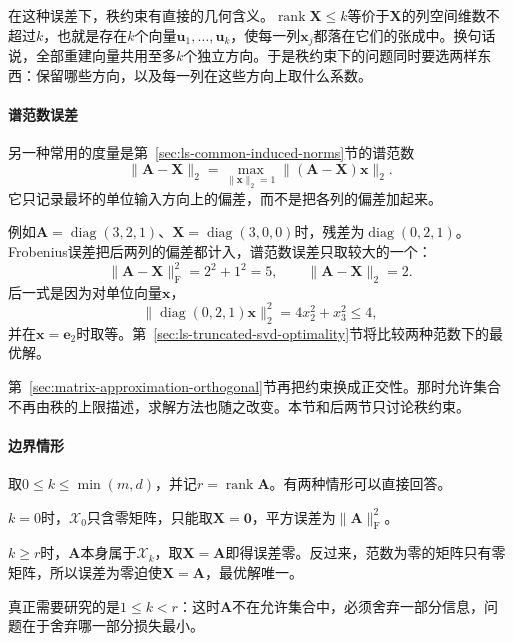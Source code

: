 在这种误差下，秩约束有直接的几何含义。$\operatorname{rank}\bm X\leq k$等价于$\bm X$的列空间维数不超过$k$，也就是存在$k$个向量$\bm u_1,\ldots,\bm u_k$，使每一列$\bm x_j$都落在它们的张成中。换句话说，全部重建向量共用至多$k$个独立方向。于是秩约束下的问题同时要选两样东西：保留哪些方向，以及每一列在这些方向上取什么系数。

\paragraph{谱范数误差}
另一种常用的度量是第~\ref{sec:ls-common-induced-norms}节的谱范数
\[
 \lVert\bm A-\bm X\rVert_2=\max_{\lVert\bm x\rVert_2=1}\lVert(\bm A-\bm X)\bm x\rVert_2 .
\]
它只记录最坏的单位输入方向上的偏差，而不是把各列的偏差加起来。

例如$\bm A=\operatorname{diag}(3,2,1)$、$\bm X=\operatorname{diag}(3,0,0)$时，残差为$\operatorname{diag}(0,2,1)$。Frobenius误差把后两列的偏差都计入，谱范数误差只取较大的一个：
\[
 \lVert\bm A-\bm X\rVert_{\mathrm F}^2=2^2+1^2=5,\qquad
 \lVert\bm A-\bm X\rVert_2=2 .
\]
后一式是因为对单位向量$\bm x$，
\[
 \lVert\operatorname{diag}(0,2,1)\bm x\rVert_2^2=4x_2^2+x_3^2\leq4 ,
\]
并在$\bm x=\bm e_2$时取等。第~\ref{sec:ls-truncated-svd-optimality}节将比较两种范数下的最优解。

第~\ref{sec:matrix-approximation-orthogonal}节再把约束换成正交性。那时允许集合不再由秩的上限描述，求解方法也随之改变。本节和后两节只讨论秩约束。

\paragraph{边界情形}
取$0\leq k\leq\min(m,d)$，并记$r=\operatorname{rank}\bm A$。有两种情形可以直接回答。

$k=0$时，$\mathcal X_0$只含零矩阵，只能取$\bm X=\bm0$，平方误差为$\lVert\bm A\rVert_{\mathrm F}^2$。

$k\geq r$时，$\bm A$本身属于$\mathcal X_k$，取$\bm X=\bm A$即得误差零。反过来，范数为零的矩阵只有零矩阵，所以误差为零迫使$\bm X=\bm A$，最优解唯一。

真正需要研究的是$1\leq k<r$：这时$\bm A$不在允许集合中，必须舍弃一部分信息，问题在于舍弃哪一部分损失最小。

